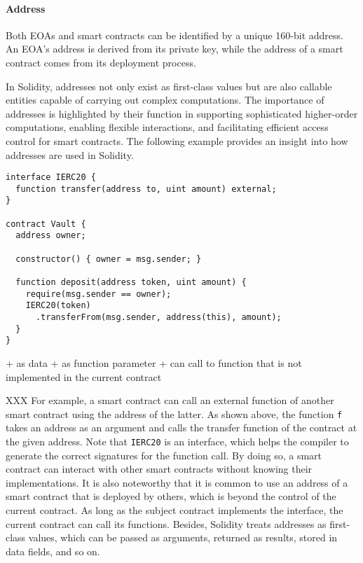 \paragraph{Address}
Both EOAs and smart contracts can be identified by a unique 160-bit address. 
An EOA's address is derived from its private key, while the address of a smart contract comes from its deployment process.

In Solidity, addresses not only exist as first-class values but are also callable entities capable of carrying out complex computations. 
The importance of addresses is highlighted by their function in supporting sophisticated higher-order computations, enabling flexible interactions, and facilitating efficient access control for smart contracts. 
The following example provides an insight into how addresses are used in Solidity.

\begin{lstlisting}
interface IERC20 {
  function transfer(address to, uint amount) external;
}

contract Vault {
  address owner;
  
  constructor() { owner = msg.sender; }

  function deposit(address token, uint amount) {
    require(msg.sender == owner);
    IERC20(token)
      .transferFrom(msg.sender, address(this), amount);
  }
}
\end{lstlisting}


+ as data 
+ as function parameter
+ can call to function that is not implemented in the current contract

XXX For example, a smart contract can call an external function of another smart contract using the address of the latter.
As shown above, the function \texttt{f} takes an address as an argument and calls the transfer function of the contract at the given address. 
Note that \texttt{IERC20} is an interface, which helps the compiler to generate the correct signatures for the function call.
By doing so, a smart contract can interact with other smart contracts without knowing their implementations.
It is also noteworthy that it is common to use an address of a smart contract that is deployed by others, which is beyond the control of the current contract. 
As long as the subject contract implements the interface, the current contract can call its functions.
Besides, Solidity treats addresses as first-class values, which can be passed as arguments, returned as results, stored in data fields, and so on.


